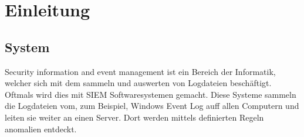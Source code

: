 \chapter{Einleitung}
\section{ System}
Security information and event management ist ein Bereich der Informatik, welcher sich mit dem sammeln und auswerten von Logdateien beschäftigt.
Oftmals wird dies mit SIEM Softwaresystemen gemacht.
Diese Systeme sammeln die Logdateien vom, zum Beispiel, Windows Event Log auff allen Computern und leiten sie weiter an einen Server.
Dort werden mittels definierten Regeln anomalien entdeckt.
